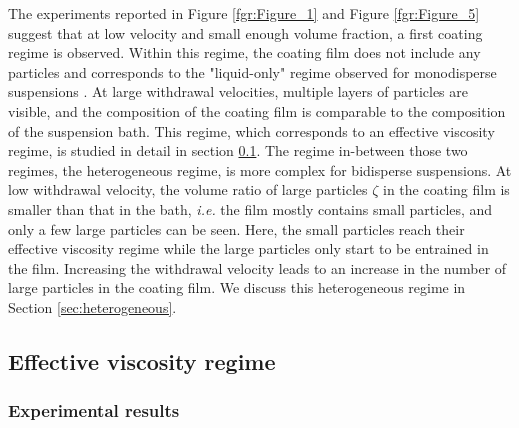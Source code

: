\documentclass{jfm}
\begin{document}
The experiments reported in Figure \ref{fgr:Figure_1} and Figure \ref{fgr:Figure_5} suggest that at low velocity and small enough volume fraction, a first coating regime is observed. Within this regime, the coating film does not include any particles and corresponds to the "liquid-only" regime observed for monodisperse suspensions \cite[][]{gans2019dip}. At large withdrawal velocities, multiple layers of particles are visible, and the composition of the coating film is comparable to the composition of the suspension bath. This regime, which corresponds to an effective viscosity regime, is studied in detail in section \ref{sec:thick}. The regime in-between those two regimes, the heterogeneous regime, is more complex for bidisperse suspensions. At low withdrawal velocity, the volume ratio of large particles $\zeta$ in the coating film is smaller than that in the bath, \textit{i.e.} the film mostly contains small particles, and only a few large particles can be seen. Here, the small particles reach their effective viscosity regime while the large particles only start to be entrained in the film. Increasing the withdrawal velocity leads to an increase in the number of large particles in the coating film. We discuss this heterogeneous regime in Section \ref{sec:heterogeneous}.

\subsection{Effective viscosity regime} \label{sec:thick}

\subsubsection{Experimental results}
\end{document}
